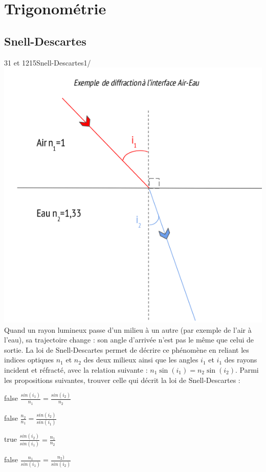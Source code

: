 \documentclass[11pt]{article}
\begin{document}
\tableofcontents


    \section{Trigonométrie}
			\subsection{Snell-Descartes}
	    \begin{question}{31 et 1215}{Snell-Descartes}{1}{/}
         	\includegraphics[width=\textwidth]{Christopher/Figures_Christopher/SD_UE.png}
				Quand un rayon lumineux passe d'un milieu à un autre (par exemple de l'air à l'eau), sa trajectoire change : son angle d'arrivée n'est pas le même que celui de sortie. La loi de Snell-Descartes permet de décrire ce phénomène en reliant les indices optiques $n_1$ et $n_2$ des deux milieux ainsi que les angles  $i_1$ et  $i_1$ des rayons incident et réfracté, avec la relation suivante  : $n_1\sin(i_1)=n_2\sin(i_2)$. Parmi les propositions suivantes, trouver celle qui décrit la loi de Snell-Descartes : 
            \end{question}

            \begin{reponses}
            	\item[false] $\frac{sin(i_1)}{n_1}=\frac{sin(i_2)}{n_2}$
            	\item[false] $\frac{n_2}{n_1}=\frac{sin(i_2)}{sin(i_1)}$
                \item[true] $\frac{sin(i_2)}{sin(i_1)}=\frac{n_1}{n_2}$
                \item[false] $\frac{n_1}{sin(i_1)}=\frac{n_2)}{sin(i_2)}$
            \end{reponses}
                   
\end{document}
